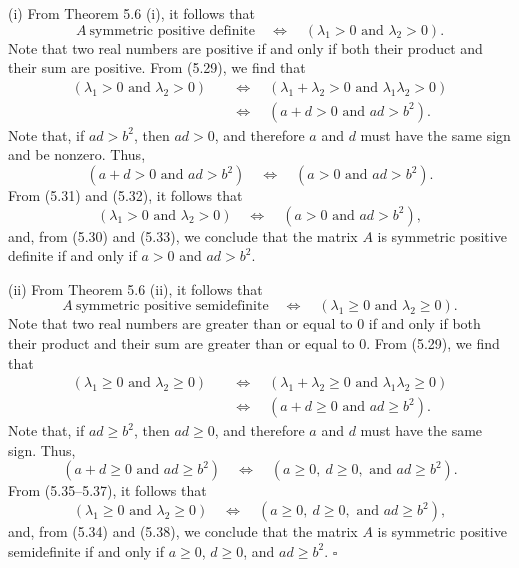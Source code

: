 (i) From Theorem 5.6 (i), it follows that
\begin{equation}
A \ \text{symmetric positive definite} \quad \Longleftrightarrow \quad (\lambda_1 > 0 \text{ and } \lambda_2 > 0).
\end{equation}
Note that two real numbers are positive if and only if both their product and their sum
are positive. From (5.29), we find that
\begin{equation}
\begin{split}
(\lambda_1 > 0 \text{ and } \lambda_2 > 0) \quad &\Longleftrightarrow \quad (\lambda_1+\lambda_2 > 0 \text{ and } \lambda_1\lambda_2 > 0)\\
&\Longleftrightarrow \quad (a+d > 0 \text{ and } ad > b^2).
\end{split}
\end{equation}
Note that, if $ad > b^2$, then $ad > 0$, and therefore $a$ and $d$ must have the same
sign and be nonzero. Thus,
\begin{equation}
(a+d > 0 \text{ and } ad > b^2) \quad \Longleftrightarrow \quad (a > 0 \text{ and } ad > b^2).
\end{equation}
From (5.31) and (5.32), it follows that
\begin{equation}
(\lambda_1 > 0 \text{ and } \lambda_2 > 0) \quad \Longleftrightarrow \quad (a > 0 \text{ and } ad > b^2),
\end{equation}
and, from (5.30) and (5.33), we conclude that the matrix $A$ is symmetric positive
definite if and only if $a > 0$ and $ad > b^2$.

(ii) From Theorem 5.6 (ii), it follows that
\begin{equation}
A \ \text{symmetric positive semidefinite} \quad \Longleftrightarrow \quad (\lambda_1 \geq 0 \text{ and } \lambda_2 \geq 0).
\end{equation}
Note that two real numbers are greater than or equal to $0$ if and only if both their
product and their sum are greater than or equal to $0$. From (5.29), we find that
\begin{align}
(\lambda_1 \geq 0 \text{ and } \lambda_2 \geq 0) \quad &\Longleftrightarrow \quad (\lambda_1+\lambda_2 \geq 0 \text{ and } \lambda_1\lambda_2 \geq 0)\\
&\Longleftrightarrow \quad (a+d \geq 0 \text{ and } ad \geq b^2).
\end{align}
Note that, if $ad \geq b^2$, then $ad \geq 0$, and therefore $a$ and $d$ must have the
same sign. Thus,
\begin{equation}
(a+d \geq 0 \text{ and } ad \geq b^2) \quad \Longleftrightarrow \quad (a \geq 0,\ d \geq 0, \text{ and } ad \geq b^2).
\end{equation}
From (5.35--5.37), it follows that
\begin{equation}
(\lambda_1 \geq 0 \text{ and } \lambda_2 \geq 0) \quad \Longleftrightarrow \quad (a \geq 0,\ d \geq 0, \text{ and } ad \geq b^2),
\end{equation}
and, from (5.34) and (5.38), we conclude that the matrix $A$ is symmetric positive
semidefinite if and only if $a \geq 0$, $d \geq 0$, and $ad \geq b^2$.
\hfill$\square$
\par\medskip

